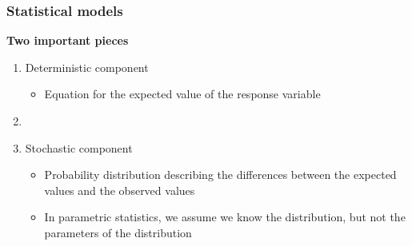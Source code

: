\documentclass[color=usenames,dvipsnames]{beamer}\usepackage[]{graphicx}\usepackage[]{color}
\begin{document}
\begin{frame}
  \frametitle{Statistical models}
  {\bf \large Two important pieces \par}
  \large
  \begin{enumerate}[\bf \color{gb} (1)]
    \large
    \item<1-> Deterministic component%
      \begin{itemize}
        \large
        \item Equation for the expected value of the response
          variable %
      \end{itemize}
    \item[]
    \item<2-> Stochastic component %
      \begin{itemize}
        \large
        \item Probability distribution %
          describing the differences
          between the expected values and the observed values
        \item In parametric statistics, we assume we know the
          distribution, but not the parameters of the distribution
      \end{itemize}
  \end{enumerate}
\end{frame}




\end{document}
